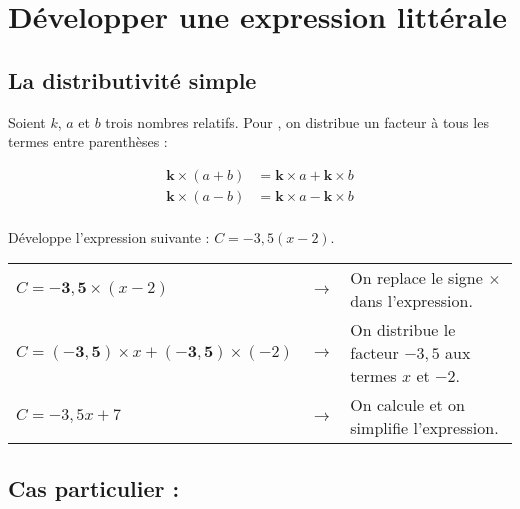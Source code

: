 \section{Développer une expression littérale}

\subsection{La distributivité simple}

\begin{propriete}
Soient $k$, $a$ et $b$ trois nombres relatifs. Pour , on distribue un facteur à tous les termes entre parenthèses :

\begin{align*}
    \boldsymbol{k \times} (a + b) &= \boldsymbol{k \times} a + \boldsymbol{k \times} b\\
    \boldsymbol{k \times} (a - b) &= \boldsymbol{k \times} a - \boldsymbol{k \times} b\\
\end{align*}

\end{propriete} 


\begin{exemple*1}

Développe l'expression suivante : $C = - 3,5(x - 2)$.

\correction

\begin{tabular}{lcl}
$C = \boldsymbol{- 3,5 \times} (x - 2)$ & $\longrightarrow$ & On replace le signe $\boldsymbol{\times}$ dans l'expression. \\
$C = \boldsymbol{(- 3,5)} \times x + \boldsymbol{(- 3,5)} \times (- 2)$ & $\longrightarrow$ & On distribue le facteur $-3,5$ aux termes $x$ et $-2$. \\
$C = - 3,5x + 7$ & $\longrightarrow$ & On calcule et on simplifie l'expression. \\
\end{tabular}
\end{exemple*1}




\subsection{Cas particulier : }

